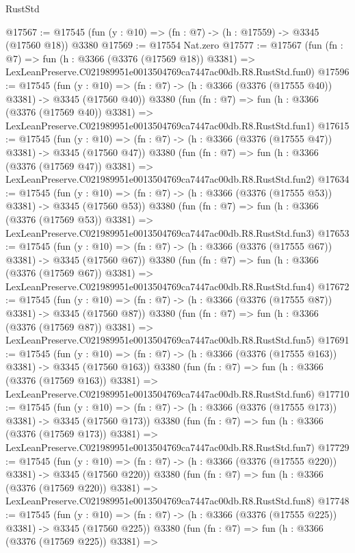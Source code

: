 \begin{lexlean}{RustStd}
\begin{coremodule}
@17567 := @17545 (fun (y : @10) => (fn : @7) -> (h : @17559) -> @3345 (@17560 @18)) @3380
@17569 := @17554 Nat.zero
@17577 := @17567
    (fun (fn : @7) =>
    fun (h : @3366 (@3376 (@17569 @18)) @3381) =>
    LexLeanPreserve.C021989951e0013504769ca7447ac00db.R8.RustStd.fun0)
@17596 := @17545
    (fun (y : @10) => (fn : @7) -> (h : @3366 (@3376 (@17555 @40)) @3381) -> @3345 (@17560 @40))
    @3380
    (fun (fn : @7) =>
    fun (h : @3366 (@3376 (@17569 @40)) @3381) =>
    LexLeanPreserve.C021989951e0013504769ca7447ac00db.R8.RustStd.fun1)
@17615 := @17545
    (fun (y : @10) => (fn : @7) -> (h : @3366 (@3376 (@17555 @47)) @3381) -> @3345 (@17560 @47))
    @3380
    (fun (fn : @7) =>
    fun (h : @3366 (@3376 (@17569 @47)) @3381) =>
    LexLeanPreserve.C021989951e0013504769ca7447ac00db.R8.RustStd.fun2)
@17634 := @17545
    (fun (y : @10) => (fn : @7) -> (h : @3366 (@3376 (@17555 @53)) @3381) -> @3345 (@17560 @53))
    @3380
    (fun (fn : @7) =>
    fun (h : @3366 (@3376 (@17569 @53)) @3381) =>
    LexLeanPreserve.C021989951e0013504769ca7447ac00db.R8.RustStd.fun3)
@17653 := @17545
    (fun (y : @10) => (fn : @7) -> (h : @3366 (@3376 (@17555 @67)) @3381) -> @3345 (@17560 @67))
    @3380
    (fun (fn : @7) =>
    fun (h : @3366 (@3376 (@17569 @67)) @3381) =>
    LexLeanPreserve.C021989951e0013504769ca7447ac00db.R8.RustStd.fun4)
@17672 := @17545
    (fun (y : @10) => (fn : @7) -> (h : @3366 (@3376 (@17555 @87)) @3381) -> @3345 (@17560 @87))
    @3380
    (fun (fn : @7) =>
    fun (h : @3366 (@3376 (@17569 @87)) @3381) =>
    LexLeanPreserve.C021989951e0013504769ca7447ac00db.R8.RustStd.fun5)
@17691 := @17545
    (fun (y : @10) => (fn : @7) -> (h : @3366 (@3376 (@17555 @163)) @3381) -> @3345 (@17560 @163))
    @3380
    (fun (fn : @7) =>
    fun (h : @3366 (@3376 (@17569 @163)) @3381) =>
    LexLeanPreserve.C021989951e0013504769ca7447ac00db.R8.RustStd.fun6)
@17710 := @17545
    (fun (y : @10) => (fn : @7) -> (h : @3366 (@3376 (@17555 @173)) @3381) -> @3345 (@17560 @173))
    @3380
    (fun (fn : @7) =>
    fun (h : @3366 (@3376 (@17569 @173)) @3381) =>
    LexLeanPreserve.C021989951e0013504769ca7447ac00db.R8.RustStd.fun7)
@17729 := @17545
    (fun (y : @10) => (fn : @7) -> (h : @3366 (@3376 (@17555 @220)) @3381) -> @3345 (@17560 @220))
    @3380
    (fun (fn : @7) =>
    fun (h : @3366 (@3376 (@17569 @220)) @3381) =>
    LexLeanPreserve.C021989951e0013504769ca7447ac00db.R8.RustStd.fun8)
@17748 := @17545
    (fun (y : @10) => (fn : @7) -> (h : @3366 (@3376 (@17555 @225)) @3381) -> @3345 (@17560 @225))
    @3380
    (fun (fn : @7) =>
    fun (h : @3366 (@3376 (@17569 @225)) @3381) =>

\end{coremodule}
\end{lexlean}
